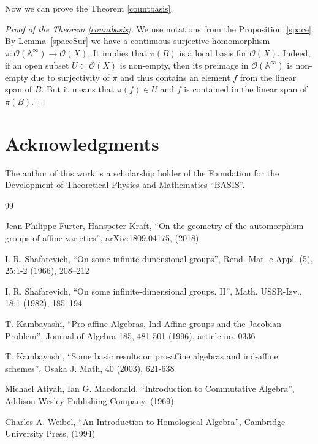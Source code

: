 \documentclass[a4paper,draft,reqno,12pt]{amsart}
\theoremstyle{definition}
\theoremstyle{remark}
\def\BA{{\mathbb A}}
\def\CO{\mathcal{O}}
\begin{document}
Now we can prove the Theorem \ref{countbasis}.

\begin{proof}[Proof of the Theorem \ref{countbasis}]
    We use notations from the Proposition~\ref{space}. By Lemma~\ref{spaceSur} we have a continuous surjective homomorphism $\pi: \CO(\BA^{\infty}) \to \CO(X)$. It implies that $\pi(B)$ is a local basis for $\CO(X)$. Indeed, if an open subset $U \subset \CO(X)$ is non-empty, then its preimage in $\CO(\BA^{\infty})$ is non-empty due to surjectivity of $\pi$ and thus contains an element $f$ from the linear span of $B$. But it means that $\pi(f) \in U$ and $f$ is contained in the linear span of $\pi(B)$.

\end{proof}

\section*{Acknowledgments}

The author of this work is a scholarship holder of the Foundation for the Development of Theoretical Physics and Mathematics “BASIS”.

\begin{thebibliography}{99}

 Jean-Philippe Furter, Hanspeter Kraft, “On the geometry of the automorphism groups of affine varieties”,  arXiv:1809.04175, (2018)

 I. R. Shafarevich, “On some infinite-dimensional groups”, Rend. Mat. e Appl. (5), 25:1-2 (1966), 208–212

 I. R. Shafarevich, “On some infinite-dimensional groups. II”, Math. USSR-Izv., 18:1 (1982), 185–194

 T. Kambayashi, “Pro-affine Algebras, Ind-Affine groups and the Jacobian Problem”, Journal of Algebra 185, 481-501 (1996), article no. 0336

 T. Kambayashi, “Some basic results on pro-affine algebras and ind-affine schemes”, Osaka J. Math, 40 (2003), 621-638

 Michael Atiyah, Ian G. Macdonald, “Introduction to Commutative Algebra”, Addison-Wesley Publishing Company, (1969)

 Charles A. Weibel, “An Introduction to Homological Algebra”, Cambridge University Press, (1994)

\end{thebibliography}
\end{document}
